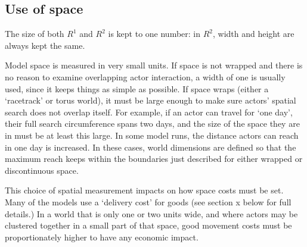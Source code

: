 \subsection{Use of space }


The size of both $R^1$ and $R^2$ is kept to one number: in $R^2$, width and height are always kept the same. 

Model space is measured in very small units. If space is not wrapped and there is no reason to examine overlapping actor interaction, a width of one is usually used, since it keeps things as simple as possible. If space wraps (either a `racetrack' or torus world), it must be large enough to make sure actors' spatial search does not overlap itself. For example, if an actor can travel for `one day', their full search circumference spans two days, and the size of the space they are in must be at least this large. In some model runs, the distance actors can reach in one day is increased. In these cases, world dimensions are defined so that the maximum reach keeps within the boundaries just described for either wrapped or discontinuous space.

This choice of spatial measurement impacts on how space costs must be set. Many of the models use a `delivery cost' for goods (see section x below for full details.) In a world that is only one or two units wide, and where actors may be clustered together in a small part of that space, good movement costs must be proportionately higher to have any economic impact.





